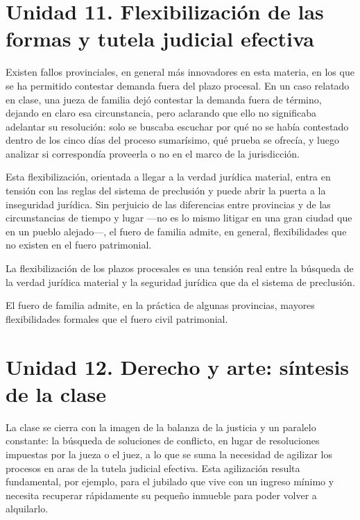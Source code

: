 \documentclass[12pt,oneside]{book}
\begin{document}
\section{Unidad 11. Flexibilización de las formas y tutela judicial efectiva}

Existen fallos provinciales, en general más innovadores en esta materia, en los que se ha permitido contestar demanda fuera del plazo procesal. En un caso relatado en clase, una jueza de familia dejó contestar la demanda fuera de término, dejando en claro esa circunstancia, pero aclarando que ello no significaba adelantar su resolución: solo se buscaba escuchar por qué no se había contestado dentro de los cinco días del proceso sumarísimo, qué prueba se ofrecía, y luego analizar si correspondía proveerla o no en el marco de la jurisdicción.

Esta flexibilización, orientada a llegar a la verdad jurídica material, entra en tensión con las reglas del sistema de preclusión y puede abrir la puerta a la inseguridad jurídica. Sin perjuicio de las diferencias entre provincias y de las circunstancias de tiempo y lugar ---no es lo mismo litigar en una gran ciudad que en un pueblo alejado---, el fuero de familia admite, en general, flexibilidades que no existen en el fuero patrimonial.

\begin{important}
La flexibilización de los plazos procesales es una tensión real entre la búsqueda de la verdad jurídica material y la seguridad jurídica que da el sistema de preclusión.

El fuero de familia admite, en la práctica de algunas provincias, mayores flexibilidades formales que el fuero civil patrimonial.
\end{important}

\section{Unidad 12. Derecho y arte: síntesis de la clase}

La clase se cierra con la imagen de la balanza de la justicia y un paralelo constante: la búsqueda de soluciones de conflicto, en lugar de resoluciones impuestas por la jueza o el juez, a lo que se suma la necesidad de agilizar los procesos en aras de la tutela judicial efectiva. Esta agilización resulta fundamental, por ejemplo, para el jubilado que vive con un ingreso mínimo y necesita recuperar rápidamente su pequeño inmueble para poder volver a alquilarlo.
\end{document}
